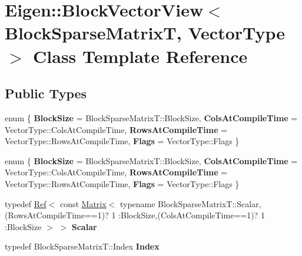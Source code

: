 \hypertarget{class_eigen_1_1_block_vector_view}{}\section{Eigen\+:\+:Block\+Vector\+View$<$ Block\+Sparse\+MatrixT, Vector\+Type $>$ Class Template Reference}
\label{class_eigen_1_1_block_vector_view}
\subsection*{Public Types}
\begin{DoxyCompactItemize}
\item 
\mbox{\label{class_eigen_1_1_block_vector_view_af2e6019548f761a2d27dd3117037a942}} 
enum \{ {\bfseries Block\+Size} = Block\+Sparse\+MatrixT\+:\+:Block\+Size, 
{\bfseries Cols\+At\+Compile\+Time} = Vector\+Type\+:\+:Cols\+At\+Compile\+Time, 
{\bfseries Rows\+At\+Compile\+Time} = Vector\+Type\+:\+:Rows\+At\+Compile\+Time, 
{\bfseries Flags} = Vector\+Type\+:\+:Flags
 \}
\item 
\mbox{\label{class_eigen_1_1_block_vector_view_af0bc0880b316c347e8718f683ff29c67}} 
enum \{ {\bfseries Block\+Size} = Block\+Sparse\+MatrixT\+:\+:Block\+Size, 
{\bfseries Cols\+At\+Compile\+Time} = Vector\+Type\+:\+:Cols\+At\+Compile\+Time, 
{\bfseries Rows\+At\+Compile\+Time} = Vector\+Type\+:\+:Rows\+At\+Compile\+Time, 
{\bfseries Flags} = Vector\+Type\+:\+:Flags
 \}
\item 
\mbox{\label{class_eigen_1_1_block_vector_view_a25a7cfe0ac968241fd19f09d0a4eb67c}} 
typedef \hyperlink{group___core___module_class_eigen_1_1_ref}{Ref}$<$ const \hyperlink{group___core___module_class_eigen_1_1_matrix}{Matrix}$<$ typename Block\+Sparse\+Matrix\+T\+::\+Scalar,(Rows\+At\+Compile\+Time==1)? 1 \+:Block\+Size,(Cols\+At\+Compile\+Time==1)? 1 \+:Block\+Size $>$ $>$ {\bfseries Scalar}
\item 
\mbox{\label{class_eigen_1_1_block_vector_view_a2bd6af16b910d137e1c608ff3e441786}} 
typedef Block\+Sparse\+Matrix\+T\+::\+Index {\bfseries Index}
\item 

\end{DoxyCompactItemize}
